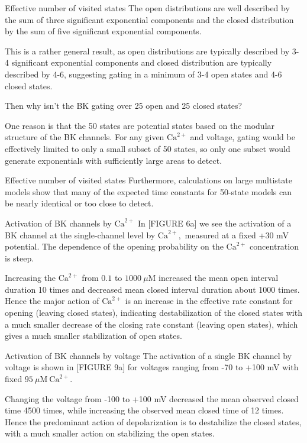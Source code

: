 \documentclass{beamer}
\newcommand{\ca}{\text{Ca}^{2+}}
\begin{document}
\begin{frame}{Effective number of visited states}
The open distributions are well described by the sum of three significant exponential components and the closed distribution by the sum of five significant exponential components.

This is a rather general result, as open distributions are typically described by 3-4 significant exponential components and closed distribution are typically described by 4-6, suggesting gating in a minimum of 3-4 open states and 4-6 closed states.

Then why isn't the BK gating over 25 open and 25 closed states?

One reason is that the 50 states are potential states based on the modular structure of the BK channels. 
For any given $\ca$ and voltage, gating would be effectively limited to only a small subset of 50 states, so only one subset would generate exponentials with sufficiently large areas to detect.

\end{frame}

\begin{frame}{Effective number of visited states}
Furthermore, calculations on large multistate models show that many of the expected time constants for 50-state models can be nearly identical or too close to detect.
\end{frame}

\begin{frame}{Activation of BK channels by $\ca$}
In [FIGURE 6a] we see the activation of a BK channel at the single-channel level by $\ca,$ measured at a fixed +30 mV potential.
The dependence of the opening probability on the $\ca$ concentration is steep.

Increasing the $\ca$ from $0.1$ to $1000\ \mu\text{M}$ increased the mean open interval duration 10 times and decreased mean closed interval duration about 1000 times.
Hence the major action of $\ca$ is an increase in the effective rate constant for opening (leaving closed states), indicating destabilization of the closed states with a much smaller decrease of the closing rate constant (leaving open states), which gives a much smaller stabilization of open states. 

\end{frame}

\begin{frame}{Activation of BK channels by voltage}
The activation of a single BK channel by voltage is shown in [FIGURE 9a] for voltages ranging from -70 to +100 mV with fixed $95 \ \mu\text{M}\ \ca.$ 

Changing the voltage from -100 to +100 mV decreased the mean observed closed time 4500 times, while increasing the observed mean closed time of 12 times.
Hence the predominant action of depolarization is to destabilize the closed states, with a much smaller action on stabilizing the open states.
\end{frame}
\end{document}
